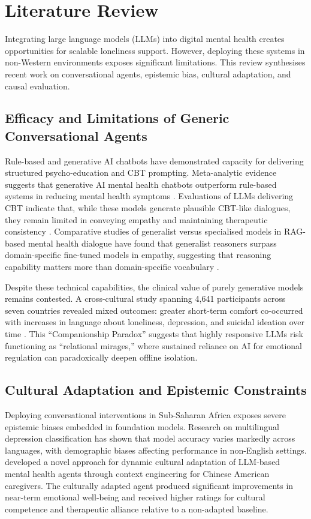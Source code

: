 \documentclass[12pt,a4paper]{article}
\begin{document}
\section{Literature Review}

Integrating large language models (LLMs) into digital mental health creates opportunities for scalable loneliness support. However, deploying these systems in non-Western environments exposes significant limitations. This review synthesises recent work on conversational agents, epistemic bias, cultural adaptation, and causal evaluation.

\subsection{Efficacy and Limitations of Generic Conversational Agents}

Rule-based and generative AI chatbots have demonstrated capacity for delivering structured psycho-education and CBT prompting. Meta-analytic evidence suggests that generative AI mental health chatbots outperform rule-based systems in reducing mental health symptoms \citep{Viduani2025}. Evaluations of LLMs delivering CBT indicate that, while these models generate plausible CBT-like dialogues, they remain limited in conveying empathy and maintaining therapeutic consistency \citep{Bedi2026}. Comparative studies of generalist versus specialised models in RAG-based mental health dialogue have found that generalist reasoners surpass domain-specific fine-tuned models in empathy, suggesting that reasoning capability matters more than domain-specific vocabulary \citep{Kafi2026}.

Despite these technical capabilities, the clinical value of purely generative models remains contested. A cross-cultural study spanning 4,641 participants across seven countries revealed mixed outcomes: greater short-term comfort co-occurred with increases in language about loneliness, depression, and suicidal ideation over time \citep{AmatLefort2026}. This ``Companionship Paradox'' suggests that highly responsive LLMs risk functioning as ``relational mirages,'' where sustained reliance on AI for emotional regulation can paradoxically deepen offline isolation.

\subsection{Cultural Adaptation and Epistemic Constraints}

Deploying conversational interventions in Sub-Saharan Africa exposes severe epistemic biases embedded in foundation models. Research on multilingual depression classification has shown that model accuracy varies markedly across languages, with demographic biases affecting performance in non-English settings. \citet{Xie2025} developed a novel approach for dynamic cultural adaptation of LLM-based mental health agents through context engineering for Chinese American caregivers. The culturally adapted agent produced significant improvements in near-term emotional well-being and received higher ratings for cultural competence and therapeutic alliance relative to a non-adapted baseline.
\end{document}
